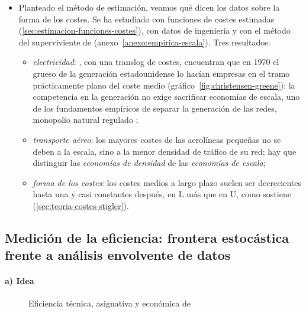 \documentclass[11pt]{article}
\begin{document}
\begin{itemize}
\item Planteado el método de estimación, veamos qué dicen los datos sobre la forma de los costes. Se ha estudiado con funciones de costes estimadas (\ref{sec:estimacion-funciones-costes}), con datos de ingeniería y con el método del superviviente de \textcite{Stigler1958Economies} (anexo~\ref{anexo:empirica-escala}). Tres resultados:
  \begin{itemize}
  \item \emph{electricidad}: \textcite{ChristensenGreene1976Economies}, con una translog de costes, encuentran que en 1970 el grueso de la generación estadounidense lo hacían empresas en el tramo prácticamente plano del coste medio (gráfico~\ref{fig:christensen-greene}): la competencia en la generación no exige sacrificar economías de escala, uno de los fundamentos empíricos de separar la generación de las redes, monopolio natural regulado  ;
  \item \emph{transporte aéreo}: los mayores costes de las aerolíneas pequeñas no se deben a la escala, sino a la menor densidad de tráfico de su red; hay que distinguir las \emph{economías de densidad} de las \emph{economías de escala}\nocite{CavesChristensenTretheway1984Density};
  \item \emph{forma de los costes}: los costes medios a largo plazo suelen ser decrecientes hasta una  y casi constantes después, en L más que en U, como sostiene  (\ref{sec:teoria-costes-stigler}).
  \end{itemize}
\end{itemize}


\subsection{Medición de la eficiencia:\cortetitulo{} frontera estocástica frente a análisis envolvente de datos}\label{sec:medicion-eficiencia-frontera}

\paragraph{a) Idea}

\begin{figure}[H]
\centering
\caption{Eficiencia técnica, asignativa y económica de }\label{fig:farrell}
\end{figure}
\end{document}
